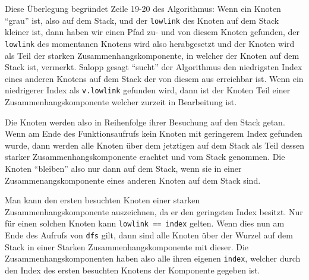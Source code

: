 \documentclass[11pt]{article}
\begin{document}
\begin{enumerate}[a)]
        Diese \"Uberlegung begr\"undet Zeile 19-20 des Algorithmus: Wenn
        ein Knoten ``grau'' ist, also auf dem Stack, und der \texttt{lowlink}
        des Knoten auf dem Stack kleiner ist, dann haben wir einen Pfad zu-
        und von diesem Knoten gefunden, der \texttt{lowlink} des 
        momentanen Knotens wird also herabgesetzt und der Knoten wird
        als Teil der starken Zusammenhangskomponente, in welcher der Knoten
        auf dem Stack ist, vermerkt. Salopp gesagt ``sucht'' der Algorithmus
        den niedrigsten Index eines anderen Knotens auf dem Stack der von
        diesem aus erreichbar ist. Wenn ein niedrigerer Index als
        \texttt{v.lowlink} gefunden wird, dann ist der Knoten Teil einer
        Zusammenhangskomponente welcher zurzeit in Bearbeitung ist.

        Die Knoten werden also in Reihenfolge ihrer Besuchung auf den Stack
        getan. Wenn am Ende des Funktionsaufrufs kein Knoten mit
        geringerem Index gefunden wurde, dann werden alle Knoten \"uber
        dem jetztigen auf dem Stack als Teil dessen starker
        Zusammenhangskomponente erachtet und vom Stack genommen. Die Knoten
        ``bleiben'' also nur dann auf dem Stack, wenn sie in einer
        Zusammenangskomponente eines anderen Knoten auf dem Stack sind.
        
        Man kann den ersten besuchten Knoten einer starken
        Zusammenhangskomponente auszeichnen, da er den geringsten Index
        besitzt. Nur f\"ur einen solchen Knoten kann \texttt{lowlink  == index}
        gelten. Wenn dies nun am Ende des Aufrufs von \texttt{dfs} gilt, dann
        sind alle Knoten \"uber der Wurzel auf dem Stack in einer Starken
        Zusammenhangskomponente mit dieser. Die Zusammenhangskomponenten haben
        also alle ihren eigenen \texttt{index}, welcher durch den Index des
        ersten besuchten Knotens der Komponente gegeben ist.







\end{enumerate} 
\end{document}
